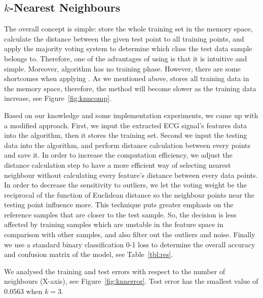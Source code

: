 \subsection{$k$-Nearest Neighbours}
\label{sec:knn}

The overall \knn{} concept is simple: store the whole training set in 
the memory space, calculate the distance between the given test point 
to all training points, and apply the majority voting system to 
determine which class the test data sample belongs to.
Therefore, one of the advantages of using \knn{} is that it is 
intuitive and simple. Moreover, \knn{} algorithm has no training 
phase. 
However, there are some shortcomes when applying \knn{}. As we 
mentioned above, \knn{} stores all training data in the memory space, 
therefore, the method will become slower as the training data 
increase, see Figure~\ref{fig:knncomp}.

Based on our knowledge and some implementation experiments, we came 
up with a modified \knn{} approach. 
First, we input the extracted ECG signal's features data into the 
algorithm, then it stores the training set. Second we input the 
testing data into the algorithm, and perform distance calculation 
between every points and save it. In order to increase the 
computation efficiency, we adjust the distance calculation step to 
have a more efficient way of selecting nearest neighbour without 
calculating every feature's distance between every data points. In 
order to decrease the sensitivity to outliers, we let the voting 
weight be the reciprocal of the function of Euclidean distance so the 
neighbour points near the testing point influence more. This 
technique puts greater emphasis on the reference samples that are 
closer to the test sample. 
So, the decision is less affected by training samples which are 
unstable in the feature space in comparison with other 
samples, and also filter out the outliers and noise. Finally we use 
a standard binary classification 0-1 loss to determine the overall 
accuracy and confusion matrix of the model, see Table~\ref{tbl:res}.

We analysed the training and test errors with respect to the number 
of neighbours (X-axis), see Figure~\ref{fig:knnerror}. Test error has 
the smallest value of $0.0563$ when $k=3$.

